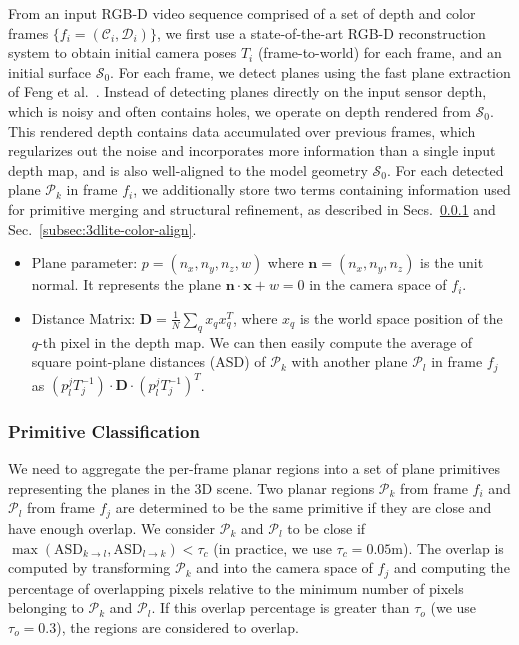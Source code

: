 From an input RGB-D video sequence comprised of a set of depth and color frames $\{f_i = (\mathcal{C}_i, \mathcal{D}_i)\}$, we first use a state-of-the-art RGB-D reconstruction system to obtain initial camera poses $T_i$ (frame-to-world) for each frame, and an initial surface $\mathcal{S}_0$.
For each frame, we detect planes using the fast plane extraction of Feng et al.~\cite{feng2014fast}. 
Instead of detecting planes directly on the input sensor depth, which is noisy and often contains holes, we operate on depth rendered from $\mathcal{S}_0$.
This rendered depth contains data accumulated over previous frames, which regularizes out the noise and incorporates more information than a single input depth map, and is also well-aligned to the model geometry $\mathcal{S}_0$.
For each detected plane $\mathcal{P}_k$ in frame $f_i$, we additionally store two terms containing information used for primitive merging and structural refinement, as described in Secs.~\ref{subsec:3dlite-plane-classify} and Sec.~\ref{subsec:3dlite-color-align}.
\begin{itemize}
    \item Plane parameter: $p=(n_x,n_y,n_z,w)$ where $\mathbf{n} = (n_x,n_y,n_z)$ is the unit normal. It represents the plane $\mathbf{n}\cdot \mathbf{x} + w=0$ in the camera space of $f_i$. 
    \item Distance Matrix: $\mathbf{D} = \frac{1}{N}\sum_{q} x_qx_q^T$, where $x_q$ is the world space position of the $q$-th pixel in the depth map. 
    We can then easily compute the average of square point-plane distances (ASD) of $\mathcal{P}_k$ with another plane $\mathcal{P}_l$ in frame $f_j$ as $(p_l^jT_j^{-1})\cdot \mathbf{D}\cdot (p_l^jT_j^{-1})^T$. 
\end{itemize}

\subsubsection{Primitive Classification}
\label{subsec:3dlite-plane-classify}

We need to aggregate the per-frame planar regions into a set of plane primitives representing the planes in the 3D scene.
Two planar regions $\mathcal{P}_k$ from frame $f_i$ and $\mathcal{P}_l$ from frame $f_j$ are determined to be the same primitive if they are close and have enough overlap. 
We consider $\mathcal{P}_k$ and $\mathcal{P}_l$ to be close if $\max(\textrm{ASD}_{k\rightarrow l}, \textrm{ASD}_{l\rightarrow k}) < \tau_c$ (in practice, we use $\tau_c = 0.05$m).
The overlap is computed by transforming $\mathcal{P}_k$ and into the camera space of $f_j$ and computing the percentage of overlapping pixels relative to the minimum number of pixels belonging to $\mathcal{P}_k$ and $\mathcal{P}_l$.
If this overlap percentage is greater than $\tau_o$ (we use $\tau_o = 0.3$), the regions are considered to overlap.

